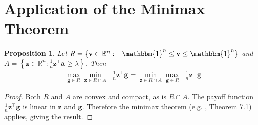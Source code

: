 \documentclass{article}[12pt]
\newtheorem{prop}[thm]{Proposition}
\theoremstyle{named}
\newcommand{\ones}[1]{\mathbbm{1}^{#1}}
\newcommand{\va}{\mathbf{a}}
\newcommand{\vg}{\mathbf{g}}    %
\newcommand{\vv}{\mathbf{v}}
\newcommand{\vz}{\mathbf{z}}
\newcommand{\RR}{\mathbb{R}}      %
\begin{document}
\section{Application of the Minimax Theorem}
\begin{prop}
\label{prop:game1duality}
Let $R = \{ \vv \in \RR^n : -\ones{n} \leq \vv \leq \ones{n} \}$ and 
$A = \left\{ \vz \in \RR^n : \frac{1}{n} \vz^\top \va \geq \lambda \right\}$. 
Then 
\begin{align*}
\max_{\vg \in R} \min_{\vz \in R \cap A} \;\; \frac{1}{n} \vz^\top \vg = \min_{\vz \in R \cap A} \max_{\vg \in R} \;\; \frac{1}{n} \vz^\top \vg
\end{align*}
\end{prop}
\begin{proof}
Both $R$ and $A$ are convex and compact, as is $R \cap A$. 
The payoff function $\frac{1}{n} \vz^\top \vg$ is linear in $\vz$ and $\vg$. 
Therefore the minimax theorem (e.g. \cite{CBL06}, Theorem 7.1) applies, giving the result.
\end{proof}
\end{document}
